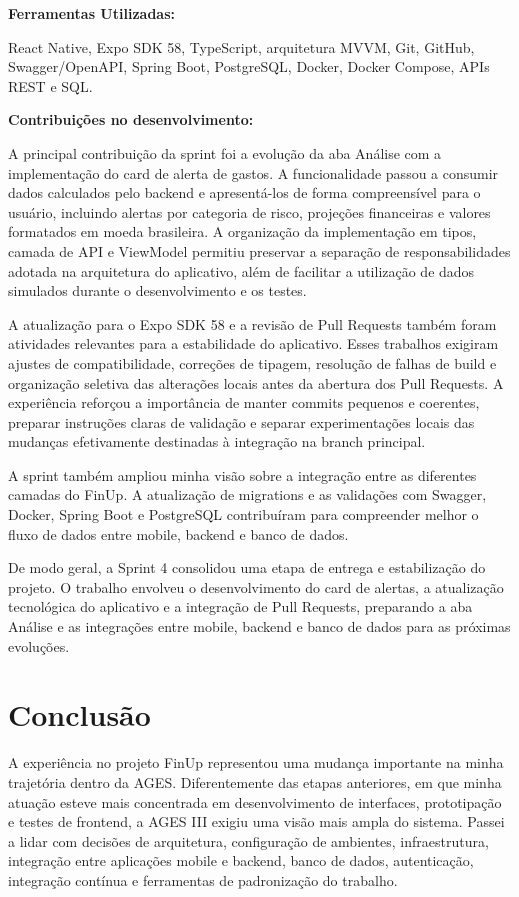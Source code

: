 \textbf{Ferramentas Utilizadas:}

React Native, Expo SDK 58, TypeScript, arquitetura MVVM, Git, GitHub,
Swagger/OpenAPI, Spring Boot, PostgreSQL, Docker, Docker Compose, APIs REST e
SQL.

\textbf{Contribuições no desenvolvimento:}

A principal contribuição da sprint foi a evolução da aba Análise com a
implementação do card de alerta de gastos. A funcionalidade passou a consumir
dados calculados pelo backend e apresentá-los de forma compreensível para o
usuário, incluindo alertas por categoria de risco, projeções financeiras e
valores formatados em moeda brasileira. A organização da implementação em
tipos, camada de API e ViewModel permitiu preservar a separação de
responsabilidades adotada na arquitetura do aplicativo, além de facilitar a
utilização de dados simulados durante o desenvolvimento e os testes.

A atualização para o Expo SDK 58 e a revisão de Pull Requests também foram
atividades relevantes para a estabilidade do aplicativo. Esses trabalhos
exigiram ajustes de compatibilidade, correções de tipagem, resolução de falhas
de build e organização seletiva das alterações locais antes da abertura dos Pull
Requests. A experiência reforçou a importância de manter commits pequenos e
coerentes, preparar instruções claras de validação e separar experimentações
locais das mudanças efetivamente destinadas à integração na branch principal.

A sprint também ampliou minha visão sobre a integração entre as diferentes
camadas do FinUp. A atualização de migrations e as validações com Swagger,
Docker, Spring Boot e PostgreSQL contribuíram para compreender melhor o fluxo de
dados entre mobile, backend e banco de dados.

De modo geral, a Sprint 4 consolidou uma etapa de entrega e estabilização do
projeto. O trabalho envolveu o desenvolvimento do card de alertas, a atualização
tecnológica do aplicativo e a integração de Pull Requests, preparando a aba
Análise e as integrações entre mobile, backend e banco de dados para as próximas
evoluções.

\section{Conclusão}

A experiência no projeto FinUp representou uma mudança importante na minha
trajetória dentro da AGES. Diferentemente das etapas anteriores, em que minha
atuação esteve mais concentrada em desenvolvimento de interfaces, prototipação e
testes de frontend, a AGES III exigiu uma visão mais ampla do sistema. Passei a
lidar com decisões de arquitetura, configuração de ambientes, infraestrutura,
integração entre aplicações mobile e backend, banco de dados, autenticação,
integração contínua e ferramentas de padronização do trabalho.

